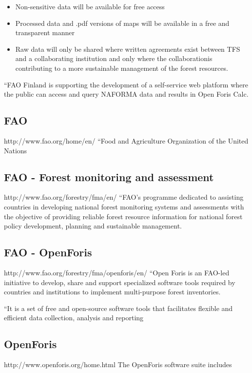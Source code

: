 \documentclass{article}
\begin{document}
\begin{itemize}
  \item Non-sensitive data will be available for free access
  \item Processed data and .pdf versions of maps will be available in a free and
  transparent manner
  \item Raw data will only be shared where written agreements exist between TFS
  and a collaborating institution and only where the collaborationis
  contributing to a more sustainable management of the forest resources.
\end{itemize}

``FAO Finland is supporting the development of a self-service web platform where
the public can access and query NAFORMA data and results in Open Foris Calc.

\subsection{FAO}
http://www.fao.org/home/en/
``Food and Agriculture Organization of the United Nations
 
\subsection{FAO - Forest monitoring and assessment}
http://www.fao.org/forestry/fma/en/
``FAO's programme dedicated to assisting countries in developing national forest
monitoring systems and assessments with the objective of providing reliable
forest resource information for national forest policy development, planning and
sustainable management.

\subsection{FAO - OpenForis}
http://www.fao.org/forestry/fma/openforis/en/ 
``Open Foris is an FAO-led initiative to develop, share and support specialized
software tools required by countries and institutions to implement multi-purpose
forest inventories.

``It is a set of free and open-source software tools that facilitates flexible
and efficient data collection, analysis and reporting

\subsection{OpenForis}
http://www.openforis.org/home.html
The OpenForis software suite includes 
\end{document}
